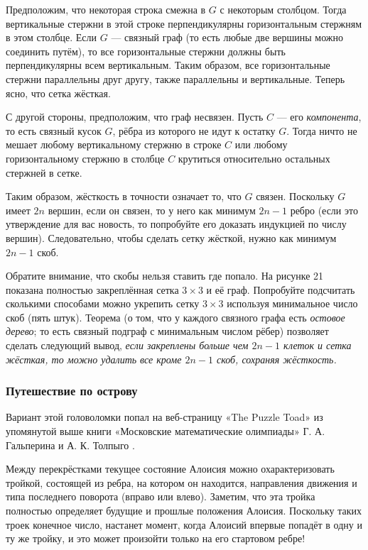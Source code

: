 Предположим, что некоторая строка смежна в $G$ с некоторым столбцом.
Тогда вертикальные стержни в этой строке перпендикулярны горизонтальным стержням в этом столбце.
Если $G$ --- связный граф (то есть любые две вершины можно соединить путём), то все горизонтальные стержни должны быть перпендикулярны всем вертикальным.
Таким образом, все горизонтальные стержни параллельны друг другу,
также параллельны и вертикальные.
Теперь ясно, что сетка жёсткая.

С другой стороны, предположим, что граф несвязен.
Пусть $C$ --- его \emph{компонента}, то есть связный кусок $G$, рёбра из которого не идут к остатку $G$.
Тогда ничто не мешает любому вертикальному стержню в строке $C$ или любому горизонтальному стержню в столбце $C$ крутиться относительно остальных стержней в сетке.

Таким образом, жёсткость в точности означает то, что $G$ связен.
Поскольку $G$ имеет $2n$ вершин, если он связен, то у него как минимум $2n - 1$ ребро
(если это утверждение для вас новость, то попробуйте его доказать индукцией по числу вершин).
Следовательно, чтобы сделать сетку жёсткой, нужно как минимум $2n - 1$ скоб.

Обратите внимание, что скобы нельзя ставить где попало.
На рисунке 21 показана полностью закреплённая сетка $3 \times 3$ и её граф.
Попробуйте подсчитать сколькими способами можно укрепить сетку $3 \times 3$ используя минимальное число скоб  (пять штук).
Теорема (о том, что у каждого связного графа есть \emph{остовое дерево}; то есть связный подграф с минимальным числом рёбер) позволяет сделать следующий вывод, \emph{если закреплены больше чем $2n - 1$ клеток и сетка жёсткая, то можно удалить все кроме $2n - 1$ скоб, сохраняя жёсткость.}

\subsubsection*{Путешествие по острову}

Вариант этой головоломки попал на веб-страницу «The Puzzle Toad» \cite{bohman-pikhurko-frieze-sleator} из упомянутой выше книги «Московские математические олимпиады» Г. А. Гальперина и А. К. Толпыго \cite{23}.

Между перекрёстками текущее состояние Алоисия можно охарактеризовать тройкой, состоящей из ребра, на котором он находится, направления движения и типа последнего поворота (вправо или влево).
Заметим, что эта тройка полностью определяет будущие и прошлые положения Алоисия.
Поскольку таких троек конечное число, настанет момент, когда Алоисий впервые попадёт в одну и ту же тройку, и это может произойти только на его стартовом ребре!

